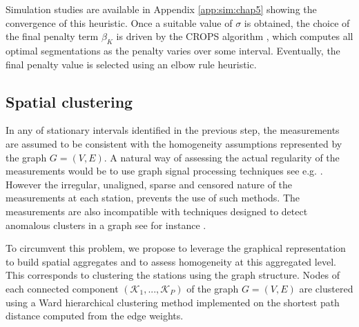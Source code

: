 Simulation studies are available in Appendix \ref{app:sim:chap5} showing the convergence of this heuristic. Once a suitable value of $\sigma$ is obtained, the choice of the final penalty term $\beta_K$ is driven by the CROPS algorithm \cite{haynes2017}, which computes all optimal segmentations as the penalty varies over some interval. Eventually, the final penalty value is selected using an elbow rule heuristic.


\subsection{Spatial clustering}\label{section:spaceclust}

In any of stationary intervals identified in the previous step, the measurements are assumed to be consistent with the homogeneity assumptions represented by the graph $G=(V, E)$. A natural way of assessing the actual regularity of the measurements would be to use graph signal processing techniques see e.g. \cite{8347162, 6494675}. However the irregular, unaligned, sparse and censored nature of the measurements at each station, prevents the use of such methods. The measurements are also incompatible with techniques designed to detect anomalous clusters in a graph see for instance \cite{10.1214/10-AOS839}.

To circumvent this problem, we propose to leverage the graphical representation to build spatial aggregates and to assess homogeneity at this aggregated level. This corresponds to clustering the stations using the graph structure. Nodes of each connected component $(\mathcal{K}_1,...,\mathcal{K}_P)$ of the graph $G=(V, E)$ are clustered using a Ward hierarchical clustering method implemented on the shortest path distance computed from the edge weights. 

